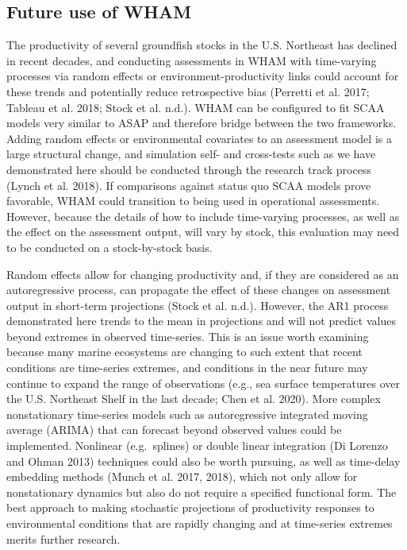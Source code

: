 \documentclass[]{article}
\begin{document}
\hypertarget{future-use-of-wham}{%
\subsection{Future use of WHAM}\label{future-use-of-wham}}

The productivity of several groundfish stocks in the U.S. Northeast has
declined in recent decades, and conducting assessments in WHAM with
time-varying processes via random effects or environment-productivity
links could account for these trends and potentially reduce
retrospective bias (Perretti et al. 2017; Tableau et al. 2018; Stock et
al. n.d.). WHAM can be configured to fit SCAA models very similar to
ASAP and therefore bridge between the two frameworks. Adding random
effects or environmental covariates to an assessment model is a large
structural change, and simulation self- and cross-tests such as we have
demonstrated here should be conducted through the research track process
(Lynch et al. 2018). If comparisons against status quo SCAA models prove
favorable, WHAM could transition to being used in operational
assessments. However, because the details of how to include time-varying
processes, as well as the effect on the assessment output, will vary by
stock, this evaluation may need to be conducted on a stock-by-stock
basis.

Random effects allow for changing productivity and, if they are
considered as an autoregressive process, can propagate the effect of
these changes on assessment output in short-term projections (Stock et
al. n.d.). However, the AR1 process demonstrated here trends to the mean
in projections and will not predict values beyond extremes in observed
time-series. This is an issue worth examining because many marine
ecosystems are changing to such extent that recent conditions are
time-series extremes, and conditions in the near future may continue to
expand the range of observations (e.g., sea surface temperatures over
the U.S. Northeast Shelf in the last decade; Chen et al. 2020). More
complex nonstationary time-series models such as autoregressive
integrated moving average (ARIMA) that can forecast beyond observed
values could be implemented. Nonlinear (e.g.~splines) or double linear
integration (Di Lorenzo and Ohman 2013) techniques could also be worth
pursuing, as well as time-delay embedding methods (Munch et al. 2017,
2018), which not only allow for nonstationary dynamics but also do not
require a specified functional form. The best approach to making
stochastic projections of productivity responses to environmental
conditions that are rapidly changing and at time-series extremes merits
further research.
\end{document}

